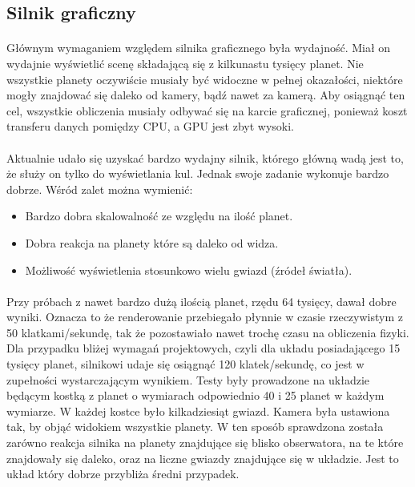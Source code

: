 \subsection{Silnik graficzny}\label{sub:silnik graficzny}
\paragraph{}

Głównym wymaganiem względem silnika graficznego była wydajność. Miał on wydajnie wyświetlić scenę składającą się z kilkunastu tysięcy planet. Nie wszystkie planety oczywiście musiały być widoczne w pełnej okazałości, niektóre mogły znajdować się daleko od kamery, bądź nawet za kamerą. Aby osiągnąć ten cel, wszystkie obliczenia musiały odbywać się na karcie graficznej, ponieważ koszt transferu danych pomiędzy CPU, a GPU jest zbyt wysoki.

\paragraph{}

Aktualnie udało się uzyskać bardzo wydajny silnik, którego główną wadą jest to, że służy on tylko do wyświetlania kul. Jednak swoje zadanie wykonuje bardzo dobrze. Wśród zalet można wymienić:

\begin{itemize}
\item Bardzo dobra skalowalność ze względu na ilość planet.
\item Dobra reakcja na planety które są daleko od widza.
\item Możliwość wyświetlenia stosunkowo wielu gwiazd (źródeł światła).
\end{itemize}

\paragraph{}

Przy próbach z nawet bardzo dużą ilością planet, rzędu 64 tysięcy, dawał dobre wyniki. Oznacza to że renderowanie przebiegało płynnie w czasie rzeczywistym z 50 klatkami/sekundę, tak że pozostawiało nawet trochę czasu na obliczenia fizyki. Dla przypadku bliżej wymagań projektowych, czyli dla układu posiadającego 15 tysięcy planet, silnikowi udaje się osiągnąć 120 klatek/sekundę, co jest w zupełności wystarczającym wynikiem. Testy były prowadzone na układzie będącym kostką z planet o wymiarach odpowiednio 40 i 25 planet w każdym wymiarze. W każdej kostce było kilkadziesiąt gwiazd. Kamera była ustawiona tak, by objąć widokiem wszystkie planety. W ten sposób sprawdzona została zarówno reakcja silnika na planety znajdujące się blisko obserwatora, na te które znajdowały się daleko, oraz na liczne gwiazdy znajdujące się w układzie. Jest to układ który dobrze przybliża średni przypadek.

